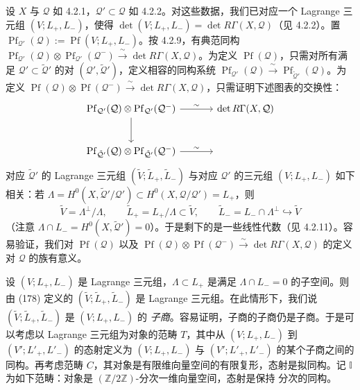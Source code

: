  设 $X$ 与 $\mathcal{Q}$ 如 4.2.1，$\mathcal{Q}'\subset\mathcal{Q}$ 如 4.2.2。对这些数据，我们已对应一个 Lagrange 三元组 $(V;L_{+},L_{-})$，使得 $\det(V;L_{+},L_{-})=\det R\Gamma(X,\mathcal{Q})$（见 4.2.2）。置 $\operatorname{Pf}_{\mathcal{Q}'}(\mathcal{Q}):=\operatorname{Pf}(V;L_{+},L_{-})$。按 4.2.9，有典范同构 $\operatorname{Pf}_{\mathcal{Q}'}(\mathcal{Q})\otimes\operatorname{Pf}_{\mathcal{Q}'}(\mathcal{Q}^{-})\xrightarrow{\ \sim\ }\det R\Gamma(X,\mathcal{Q})$。为定义 $\operatorname{Pf}(\mathcal{Q})$，只需对所有满足 $\mathcal{Q}'\subset\tilde{\mathcal{Q}}'$ 的对 $(\mathcal{Q}',\tilde{\mathcal{Q}}')$，定义相容的同构系统 $\operatorname{Pf}_{\mathcal{Q}'}(\mathcal{Q})\xrightarrow{\ \sim\ }\operatorname{Pf}_{\tilde{\mathcal{Q}}'}(\mathcal{Q})$。为定义 $\operatorname{Pf}(\mathcal{Q})\otimes\operatorname{Pf}(\mathcal{Q}^{-})\xrightarrow{\ \sim\ }\det R\Gamma(X,\mathcal{Q})$，只需证明下述图表的交换性：
\[
\begin{tikzcd}[column sep=3.4em, row sep=2.6em]
  \operatorname{Pf}_{\mathcal{Q}'}(\mathcal{Q})\otimes\operatorname{Pf}_{\mathcal{Q}'}(\mathcal{Q}^{-})
    \arrow[r, "\sim"]
    \arrow[d]
  & \det R\Gamma(X,\mathcal{Q}) \\
  \operatorname{Pf}_{\tilde{\mathcal{Q}}'}(\mathcal{Q})\otimes\operatorname{Pf}_{\tilde{\mathcal{Q}}'}(\mathcal{Q}^{-})
    \arrow[r, "\sim"]
  & \phantom{\det R\Gamma(X,\mathcal{Q})}
\end{tikzcd}
\]
对应 $\tilde{\mathcal{Q}}'$ 的 Lagrange 三元组 $(\tilde{V};\tilde{L}_{+},\tilde{L}_{-})$ 与对应 $\mathcal{Q}'$ 的三元组 $(V;L_{+},L_{-})$ 如下相关：若 $\Lambda=H^{0}(X,\tilde{\mathcal{Q}}'/\mathcal{Q}')\subset H^{0}(X,\mathcal{Q}/\mathcal{Q}')=L_{+}$，则
\begin{equation}\tag{178}
\tilde{V}=\Lambda^{\perp}/\Lambda,\qquad \tilde{L}_{+}=L_{+}/\Lambda\subset\tilde{V},\qquad \tilde{L}_{-}=L_{-}\cap\Lambda^{\perp}\hookrightarrow\tilde{V}
\end{equation}
（注意 $\Lambda\cap L_{-}=H^{0}(X,\tilde{\mathcal{Q}}')=0$）。于是剩下的是一些线性代数（见 4.2.11）。容易验证，我们对 $\operatorname{Pf}(\mathcal{Q})$ 以及 $\operatorname{Pf}(\mathcal{Q})\otimes\operatorname{Pf}(\mathcal{Q}^{-})\xrightarrow{\ \sim\ }\det R\Gamma(X,\mathcal{Q})$ 的定义对 $\mathcal{Q}$ 的族有意义。

 设 $(V;L_{+},L_{-})$ 是 Lagrange 三元组，$\Lambda\subset L_{+}$ 是满足 $\Lambda\cap L_{-}=0$ 的子空间。则由 (178) 定义的 $(\tilde{V};\tilde{L}_{+},\tilde{L}_{-})$ 是 Lagrange 三元组。在此情形下，我们说 $(\tilde{V};\tilde{L}_{+},\tilde{L}_{-})$ 是 $(V;L_{+},L_{-})$ 的 \emph{子商}。容易证明，子商的子商仍是子商。于是可以考虑以 Lagrange 三元组为对象的范畴 $T$，其中从 $(V;L_{+},L_{-})$ 到 $(V';L'_{+},L'_{-})$ 的态射定义为 $(V;L_{+},L_{-})$ 与 $(V';L'_{+},L'_{-})$ 的某个子商之间的同构。再考虑范畴 $C$，其对象是有限维向量空间的有限复形，态射是拟同构。记 $\mathbb{I}$ 为如下范畴：对象是 $(\mathbb{Z}/2\mathbb{Z})$-分次一维向量空间，态射是保持%
分次的同构。

